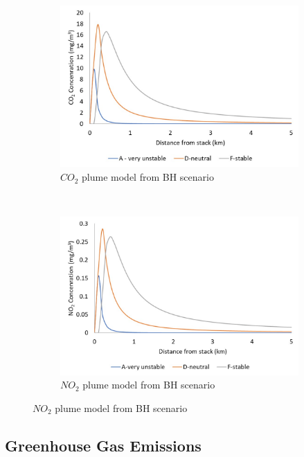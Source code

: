 \begin{figure}[t!]
    \centering
    \begin{subfigure}[t]{0.5\textwidth}
        \centering
        \includegraphics[width=\linewidth]{figures/CO2plumeBH.jpg}
        \caption{$CO_2$ plume model from BH scenario}
        \label{fig:CO2plumeBH}
    \end{subfigure}%
    ~ 
    \begin{subfigure}[t]{0.5\textwidth}
        \centering
        \includegraphics[width=\linewidth]{figures/NO2plumeBH.jpg}
        \caption{$NO_2$ plume model from BH scenario}
         \label{fig:NO2plumeBH}
    \end{subfigure}
    
\end{figure}


\subsection{Greenhouse Gas Emissions}

